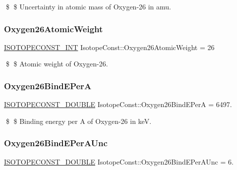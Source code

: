 \$ \$ Uncertainty in atomic mass of Oxygen-\/26 in amu. \mbox{\label{group___isotope_const-_oxygen-_o26_ga94513767de6ac4105934ea10a8b3688e}} 
\subsubsection{\texorpdfstring{Oxygen26\+Atomic\+Weight}{Oxygen26AtomicWeight}}
{\footnotesize\ttfamily \mbox{\hyperlink{group___isotope_const-_macros_ga5f18360b3e99483a35c32d789e62621c}{I\+S\+O\+T\+O\+P\+E\+C\+O\+N\+S\+T\+\_\+\+I\+NT}} Isotope\+Const\+::\+Oxygen26\+Atomic\+Weight = 26}

\$ \$ Atomic weight of Oxygen-\/26. \mbox{\label{group___isotope_const-_oxygen-_o26_gaf3718d2cb2c0ef198fcde0d03ea7793d}} 
\subsubsection{\texorpdfstring{Oxygen26\+Bind\+E\+PerA}{Oxygen26BindEPerA}}
{\footnotesize\ttfamily \mbox{\hyperlink{group___isotope_const-_macros_ga8f45a7272ce02c0b4c65c44636ed719a}{I\+S\+O\+T\+O\+P\+E\+C\+O\+N\+S\+T\+\_\+\+D\+O\+U\+B\+LE}} Isotope\+Const\+::\+Oxygen26\+Bind\+E\+PerA = 6497.}

\$ \$ Binding energy per A of Oxygen-\/26 in keV. \mbox{\label{group___isotope_const-_oxygen-_o26_ga9564f6726a264e1a2ab85b1c13c73012}} 
\subsubsection{\texorpdfstring{Oxygen26\+Bind\+E\+Per\+A\+Unc}{Oxygen26BindEPerAUnc}}
{\footnotesize\ttfamily \mbox{\hyperlink{group___isotope_const-_macros_ga8f45a7272ce02c0b4c65c44636ed719a}{I\+S\+O\+T\+O\+P\+E\+C\+O\+N\+S\+T\+\_\+\+D\+O\+U\+B\+LE}} Isotope\+Const\+::\+Oxygen26\+Bind\+E\+Per\+A\+Unc = 6.}

